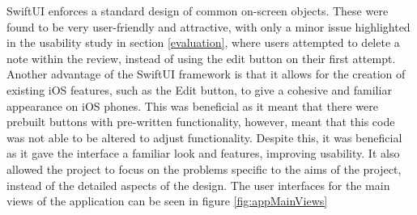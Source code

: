 \documentclass{l4proj}
\begin{document}
SwiftUI enforces a standard design of common on-screen objects. These were found to be very user-friendly and attractive, with only a minor issue highlighted in 
the usability study in section \ref{evaluation}, where users attempted to delete a note within the review, instead of using the edit button on their first 
attempt. Another advantage of the SwiftUI framework is that it allows for the creation of existing iOS features, such as the Edit button, to give a cohesive and 
familiar appearance on iOS phones. This was beneficial as it meant that there were prebuilt buttons with pre-written functionality, however, meant that this code
was not able to be altered to adjust functionality. Despite this, it was beneficial as it gave the interface a familiar look and features, improving usability. 
It also allowed the project to focus on the problems specific to the aims of the project, instead of the detailed aspects of the design. The user interfaces
for the main views of the application can be seen in figure \ref{fig:appMainViews}
\end{document}
